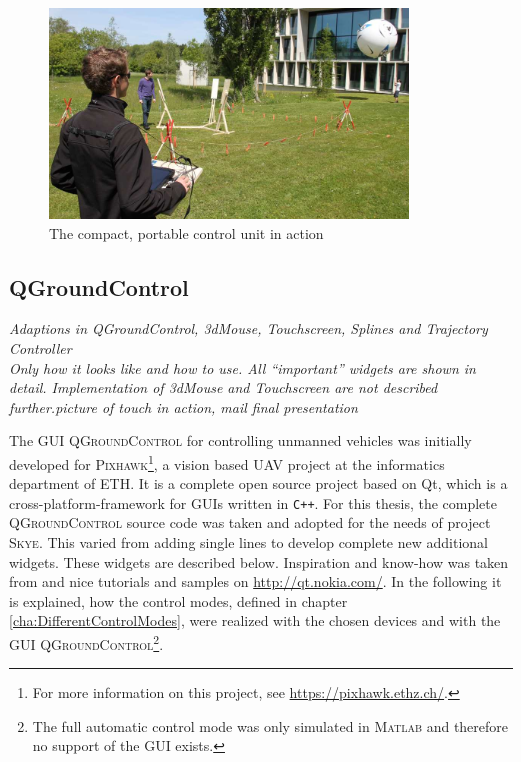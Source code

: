 \begin{figure}[H]
	\begin{center}
		\includegraphics[width=0.85\textwidth]{graphics/HMI_in_Action}
		\caption{The compact, portable control unit in action}  
		\label{fig:HMI_in_Action}
	\end{center}
\end{figure}



\subsection{QGroundControl}
\label{subsec:qGroundControl}
\textit{Adaptions in QGroundControl, 3dMouse, Touchscreen, Splines and Trajectory Controller \\ Only how it looks like and how to use. All ``important'' widgets are shown in detail. Implementation of 3dMouse and Touchscreen are not described further.picture of touch in action, mail final presentation}

The GUI \textsc{QGroundControl} for controlling unmanned vehicles was initially developed for \textsc{Pixhawk}\footnote{For more information on this project, see \url{https://pixhawk.ethz.ch/}.}, a vision based UAV project at the informatics department of \textsc{ETH}. It is a complete open source project based on Qt, which is a cross-platform-framework for GUIs written in \verb!C++!. For this thesis, the complete \textsc{QGroundControl} source code was taken and adopted for the needs of project \textsc{Skye}. This varied from adding single lines to develop complete new additional widgets. These widgets are described below. Inspiration and know-how was taken from \cite{blanchette} and nice tutorials and samples on \url{http://qt.nokia.com/}. In the following it is explained, how the control modes, defined in chapter \ref{cha:DifferentControlModes}, were realized with the chosen devices and with the GUI \textsc{QGroundControl}\footnote{The full automatic control mode was only simulated in \textsc{Matlab} and therefore no support of the GUI exists.}.

